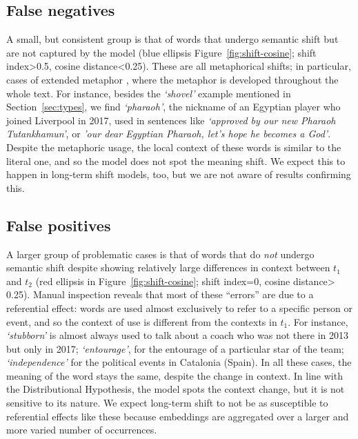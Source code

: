 \subsection{False negatives}
\label{subsec:False negatives}

A small, but consistent group is that of %
words that undergo semantic shift but are not captured by the model
(blue ellipsis Figure~\ref{fig:shift-cosine}; shift index\textgreater 0.5, cosine distance\textless 0.25).
These are all metaphorical shifts; in particular, cases of extended
metaphor \cite{werth1994extended}, where the metaphor is 
developed throughout the whole text.
For instance, besides the {\em `shovel'} example mentioned in Section~\ref{sec:types}, we find {\em `pharaoh'}, the nickname of an Egyptian player who
joined Liverpool in 2017, used in
sentences like \textit{`approved by our new Pharaoh Tutankhamun'}, or \textit{'our dear Egyptian Pharaoh, let's hope he becomes a God'}.
Despite the metaphoric usage, the local context of these words is similar to the literal one, and so the model does not spot the meaning shift. We expect this to happen in long-term shift models, too, but we are not aware of results confirming this.

\subsection{False positives}
\label{subsec:False positives}
A larger group of problematic cases is that of %
words that do \textit{not} undergo semantic shift despite showing
relatively large differences in context between $t_1$ and $t_2$ (red ellipsis in
Figure~\ref{fig:shift-cosine}; shift index=0, cosine distance\textgreater	
0.25). Manual inspection reveals that most of these ``errors'' 
are due to a referential effect: words are used
almost exclusively to refer to a specific person or event, and
so the context of use is different from the contexts in $t_1$.
For instance, {\em `stubborn'} is
almost always used to talk about a coach who was not
there in 2013 but only in 2017; 
{\em `entourage'}, for the entourage of a particular star of the team; {\em `independence'} for the
political events in Catalonia (Spain). 
In all these cases, the meaning of the word stays the same, %
despite the change in context. In line with the Distributional
Hypothesis, the model spots the context change, but it is not
sensitive to its nature. We expect long-term shift to not be as
susceptible to referential effects 
like these because
embeddings are aggregated over a larger and more varied number of
occurrences.

